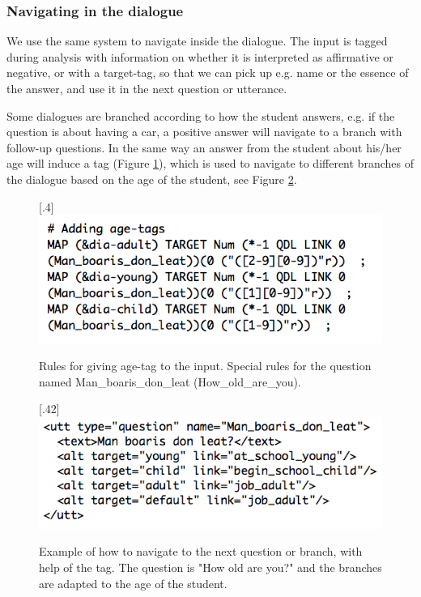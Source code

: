 \documentclass[11pt]{article}
\begin{document}
\subsubsection{Navigating in the dialogue}\label{navigation}
We use the same system to navigate inside the dialogue. The input is tagged during analysis with information on whether it is interpreted as affirmative or negative, or with a target-tag, so that we can pick up e.g. name or the essence of the answer, and use it in the next question or utterance. 

Some dialogues are branched according to how the student answers, e.g. if the question is about having a car, a positive answer will navigate to a branch with follow-up questions. In the same way an answer from the student about his/her age will induce a tag (Figure \ref{age}), which is used to navigate to different branches of the dialogue based on the age of the student, see Figure \ref{branch}.


\begin{figure}[htbp]
\begin{center}
\scalebox{.4}[.4]{\includegraphics{presentation/img/picking_age2.png}}\\
\caption{Rules for giving age-tag to the input. Special rules for the question named Man\_boaris\_don\_leat (How\_old\_are\_you).}
\label{age}
\end{center}
\end{figure}


\begin{figure}[htbp]
\begin{center}
\scalebox{.42}[.42]{\includegraphics{presentation/img/Man_boarisEng.png}}\\
\caption{Example of how to navigate to the next question or branch, with help of the tag. The question is "How old are you?" and the branches are adapted to the age of the student.}
\label{branch}
\end{center}
\end{figure}
\end{document}
